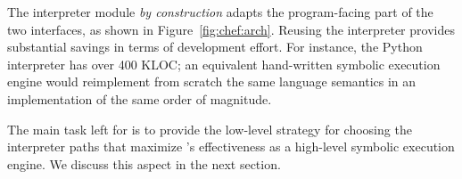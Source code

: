 The interpreter module \emph{by construction} adapts the program-facing part of the two interfaces, as shown in Figure~\ref{fig:chef:arch}.
%
Reusing the interpreter provides substantial savings in terms of development effort.  For instance, the Python interpreter has over 400 KLOC; an equivalent hand-written symbolic execution engine would reimplement from scratch the same language semantics in an implementation of the same order of magnitude.

The main task left for \chef is to provide the low-level strategy for choosing the interpreter paths that maximize \chef's effectiveness as a high-level symbolic execution engine.
%
We discuss this aspect in the next section.

